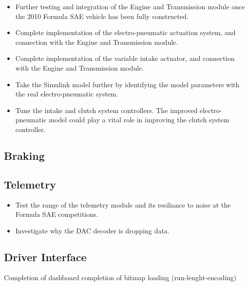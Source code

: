 \begin{itemize}
  \item Further testing and integration of the Engine and Transmission module once the 2010 Formula SAE vehicle has been fully constructed.
  \item Complete implementation of the electro-pneumatic actuation system, and connection with the Engine and Transmission module.
  \item Complete implementation of the variable intake actuator, and connection with the Engine and Transmission module.
  \item Take the Simulink model further by identifying the model parameters with the real electro-pneumatic system.
  \item Tune the intake and clutch system controllers. The improved electro-pneumatic model could play a vital role in improving the clutch system controller.
\end{itemize}

\subsection{Braking}

\subsection{Telemetry}

\begin{itemize}
  \item Test the range of the telemetry module and its resiliance to noise at the Formula SAE competitions.
  \item Investigate why the DAC decoder is dropping data.
\end{itemize}

\subsection{Driver Interface}

Completion of dashboard
completion of bitmap loading (run-lenght-encoding)
